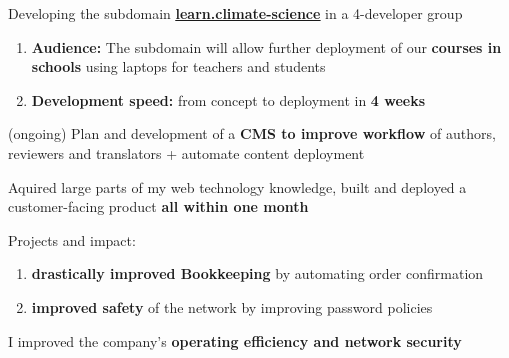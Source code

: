 \documentclass[]{jonas-cv}
\begin{document}
\begin{minipage}[t]{0.63\textwidth} 


\tinysectionsep

\sectionsep

\begin{tightemize}
    \item Developing the subdomain \href{https://learn.climate-science.com/login}{\textbf{\underline{learn.climate-science}}} in a 4-developer group
    \begin{enumerate}
        \item \textbf{Audience:} The subdomain will allow further deployment of our \textbf{courses in schools} using laptops for teachers and students
        \item \textbf{Development speed:} from concept to deployment in \textbf{4 weeks}
    \end{enumerate}
    \item (ongoing) Plan and development of a \textbf{CMS to improve workflow} of authors, reviewers and translators + automate content deployment
    \item [\faicon{angle-double-right}] Aquired large parts of my web technology knowledge, built and deployed a customer-facing product \textbf{all within one month}
\end{tightemize}
\largesectionsep



\begin{tightemize}
    \item Projects and impact:
    \begin{enumerate}
        \item \textbf{drastically improved Bookkeeping} by automating order confirmation
        \item \textbf{improved safety} of the network by improving password policies
    \end{enumerate}
    \item [\faicon{angle-double-right}] I improved the company's \textbf{operating efficiency and network security}
\end{tightemize}
\largesectionsep


\end{minipage}
\end{document}
